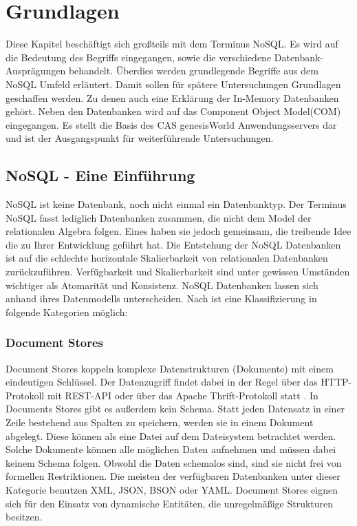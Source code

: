 
\chapter{Grundlagen}
\label{ch:grundlagen}

Diese Kapitel beschäftigt sich großteils mit dem Terminus NoSQL. Es wird auf die Bedeutung des Begriffs eingegangen, sowie die verschiedene Datenbank-Ausprägungen behandelt. Überdies werden grundlegende Begriffe aus dem NoSQL Umfeld erläutert. Damit sollen für spätere Untersuchungen Grundlagen geschaffen werden. Zu denen auch eine Erklärung der In-Memory Datenbanken gehört. Neben den Datenbanken wird auf das Component Object Model(COM) eingegangen. Es stellt die Basis des CAS genesisWorld Anwendungsservers dar und ist der Ausgangspunkt für weiterführende Untersuchungen.

\section{NoSQL - Eine Einführung}
\label{ch:grundlagen:sec:NoSQL}

NoSQL ist keine Datenbank, noch nicht einmal ein Datenbanktyp. Der Terminus NoSQL fasst lediglich Datenbanken zusammen, die nicht dem Model der relationalen Algebra folgen. Eines haben sie jedoch gemeinsam, die treibende Idee die zu Ihrer Entwicklung geführt hat. Die Entstehung der NoSQL Datenbanken ist auf die schlechte horizontale Skalierbarkeit von relationalen Datenbanken zurückzuführen. Verfügbarkeit und Skalierbarkeit sind unter gewissen Umständen wichtiger als Atomarität und Konsistenz. NoSQL Datenbanken lassen sich anhand ihres Datenmodells unterscheiden. Nach \cite{vaish2013getting} ist eine Klassifizierung in folgende Kategorien möglich:

\subsection{Document Stores}
\label{ch:grundlagen:sec:NoSQL:DocumentStores}

Document Stores koppeln komplexe Datenstrukturen (Dokumente) mit einem eindeutigen Schlüssel. Der Datenzugriff findet dabei in der Regel über das HTTP-Protokoll mit REST-API oder über das Apache Thrift-Protokoll statt \cite{agarwal2007thrift}. In Documents Stores gibt es außerdem kein Schema. Statt jeden Datensatz in einer Zeile bestehend aus Spalten zu speichern, werden sie in einem Dokument abgelegt. Diese können als eine Datei auf dem Dateisystem betrachtet werden. Solche Dokumente können alle möglichen Daten aufnehmen und müssen dabei keinem Schema folgen. Obwohl die Daten schemalos sind, sind sie nicht frei von formellen Restriktionen. Die meisten der verfügbaren Datenbanken unter dieser Kategorie benutzen XML, JSON, BSON oder YAML. Document Stores eignen sich für den Einsatz von dynamische Entitäten, die unregelmäßige Strukturen besitzen.

